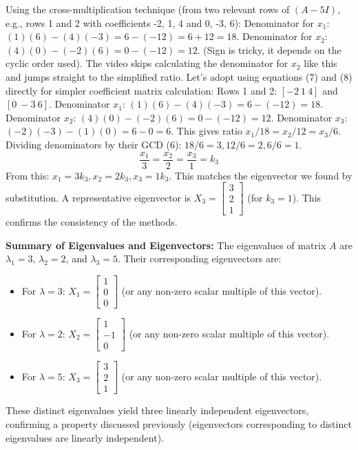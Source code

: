 \documentclass{article}
\begin{document}
Using the cross-multiplication technique (from two relevant rows of $(A-5I)$, e.g., rows 1 and 2 with coefficients -2, 1, 4 and 0, -3, 6):
Denominator for $x_1$: $(1)(6) - (4)(-3) = 6 - (-12) = 6 + 12 = 18$.
Denominator for $x_2$: $(4)(0) - (-2)(6) = 0 - (-12) = 12$. (Sign is tricky, it depends on the cyclic order used). The video skips calculating the denominator for $x_2$ like this and jumps straight to the simplified ratio. Let's adopt using equations (7) and (8) directly for simpler coefficient matrix calculation:
Rows 1 and 2: $[-2 \ 1 \ 4]$ and $[0 \ -3 \ 6]$.
Denominator $x_1$: $(1)(6) - (4)(-3) = 6 - (-12) = 18$.
Denominator $x_2$: $(4)(0) - (-2)(6) = 0 - (-12) = 12$.
Denominator $x_3$: $(-2)(-3) - (1)(0) = 6 - 0 = 6$.
This gives ratio $x_1/18 = x_2/12 = x_3/6$.
Dividing denominators by their GCD (6): $18/6=3, 12/6=2, 6/6=1$.
\[ \frac{x_1}{3} = \frac{x_2}{2} = \frac{x_3}{1} = k_3 \]
From this: $x_1 = 3k_3, x_2 = 2k_3, x_3 = 1k_3$. This matches the eigenvector we found by substitution. A representative eigenvector is $X_3 = \begin{bmatrix} 3 \\ 2 \\ 1 \end{bmatrix}$ (for $k_3=1$). This confirms the consistency of the methods.

\textbf{Summary of Eigenvalues and Eigenvectors:}
The eigenvalues of matrix $A$ are $\lambda_1=3$, $\lambda_2=2$, and $\lambda_3=5$. Their corresponding eigenvectors are:
\begin{itemize}
    \item For $\lambda = 3$: $X_1 = \begin{bmatrix} 1 \\ 0 \\ 0 \end{bmatrix}$ (or any non-zero scalar multiple of this vector).
    \item For $\lambda = 2$: $X_2 = \begin{bmatrix} 1 \\ -1 \\ 0 \end{bmatrix}$ (or any non-zero scalar multiple of this vector).
    \item For $\lambda = 5$: $X_3 = \begin{bmatrix} 3 \\ 2 \\ 1 \end{bmatrix}$ (or any non-zero scalar multiple of this vector).
\end{itemize}
These distinct eigenvalues yield three linearly independent eigenvectors, confirming a property discussed previously (eigenvectors corresponding to distinct eigenvalues are linearly independent).
\end{document}
